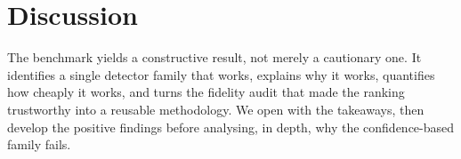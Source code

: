 
\section{Discussion}\label{sec:discussion}

The benchmark yields a constructive result, not merely a cautionary one. It
identifies a single detector family that works, explains why it works, quantifies
how cheaply it works, and turns the fidelity audit that made the ranking
trustworthy into a reusable methodology. We open with the takeaways, then develop
the positive findings before analysing, in depth, why the confidence-based family
fails.

